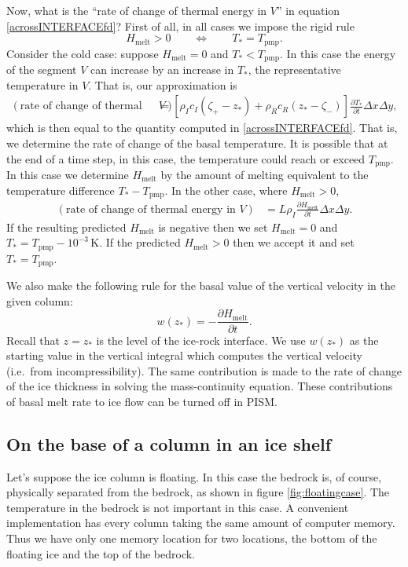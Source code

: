 \documentclass[12pt,final]{amsart}%
\theoremstyle{plain}
\theoremstyle{definition}
\theoremstyle{remark}
\newcommand{\ddt}[1]{\ensuremath{\frac{\partial #1}{\partial t}}}
\newcommand{\Tpmp}{T_{\text{pmp}}}
\begin{document}
Now, what is the ``rate of change of thermal energy in $V$'' in equation \eqref{acrossINTERFACEfd}?  First of all, in all cases we impose the rigid rule
    $$H_{\text{melt}} > 0 \qquad \iff \qquad T_\ast = \Tpmp.$$
Consider the cold case: suppose $H_{\text{melt}} = 0$ and $T_\ast < \Tpmp$.  In this case the energy of the segment $V$ can increase by an increase in $T_\ast$, the representative temperature in $V$.  That is, our approximation is
\begin{align*}
\left(\text{rate of change of thermal energy in }V\right) &= \left[\rho_I c_I (\zeta_+ - z_\ast) + \rho_R c_R (z_\ast - \zeta_-)\right] \ddt{T_\ast} \Delta x \Delta y,
\end{align*}
which is then equal to the quantity computed in \eqref{acrossINTERFACEfd}.  That is, we determine the rate of change of the basal temperature.  It is possible that at the end of a time step, in this case, the temperature could reach or exceed $\Tpmp$.  In this case we determine $H_{\text{melt}}$ by the amount of melting equivalent to the temperature difference $T_\ast - \Tpmp$.  In the other case, where $H_{\text{melt}} > 0$,
\begin{align*}
\left(\text{rate of change of thermal energy in }V\right) &= L \rho_I \ddt{H_{\text{melt}}} \Delta x \Delta y.
\end{align*}
If the resulting predicted $H_{\text{melt}}$ is negative then we set $H_{\text{melt}} = 0$ and $T_\ast=\Tpmp - 10^{-3}\,\text{K}$.  If the predicted $H_{\text{melt}} > 0$ then we accept it and set $T_\ast=\Tpmp$.


We also make the following rule for the basal value of the vertical velocity in the given column:
    $$w(z_\ast) = - \ddt{H_{\text{melt}}}.$$
Recall that $z=z_\ast$ is the level of the ice-rock interface.  We use $w(z_\ast)$ as the starting value in the vertical integral which computes the vertical velocity (i.e.~from incompressibility).  The same contribution is made to the rate of change of the ice thickness in solving the mass-continuity equation.  These contributions of basal melt rate to ice flow can be turned off in PISM.



\subsection*{On the base of a column in an ice shelf}  Let's suppose the ice column is floating.  In this case the bedrock is, of course, physically separated from the bedrock, as shown in figure \ref{fig:floatingcase}.  The temperature in the bedrock is not important in this case.  A convenient implementation has every column taking the same amount of computer memory.  Thus we have only one memory location for two locations, the bottom of the floating ice and the top of the bedrock.
\end{document}
